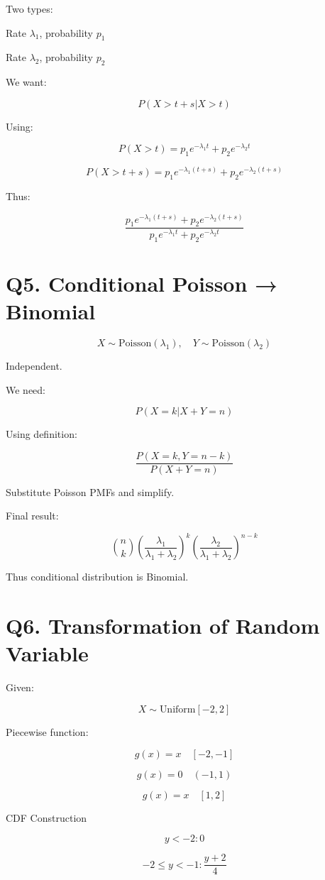 \documentclass[11pt]{article}
\begin{document}
Two types:

Rate $\lambda_1$, probability $p_1$

Rate $\lambda_2$, probability $p_2$

We want:

\[
P(X>t+s|X>t)
\]

Using:

\[
P(X>t)=p_1e^{-\lambda_1 t}+p_2e^{-\lambda_2 t}
\]

\[
P(X>t+s)=p_1e^{-\lambda_1 (t+s)}+p_2e^{-\lambda_2 (t+s)}
\]

Thus:

\[
\frac{p_1e^{-\lambda_1 (t+s)}+p_2e^{-\lambda_2 (t+s)}}{p_1e^{-\lambda_1 t}+p_2e^{-\lambda_2 t}}
\]

\section*{Q5. Conditional Poisson → Binomial}

\[
X \sim \text{Poisson}(\lambda_1), \quad Y \sim \text{Poisson}(\lambda_2)
\]

Independent.

We need:

\[
P(X=k|X+Y=n)
\]

Using definition:

\[
\frac{P(X=k,Y=n-k)}{P(X+Y=n)}
\]

Substitute Poisson PMFs and simplify.

Final result:

\[
\binom{n}{k}\left(\frac{\lambda_1}{\lambda_1+\lambda_2}\right)^k
\left(\frac{\lambda_2}{\lambda_1+\lambda_2}\right)^{n-k}
\]

Thus conditional distribution is Binomial.

\section*{Q6. Transformation of Random Variable}

Given:

\[
X \sim \text{Uniform}[-2,2]
\]

Piecewise function:

\[
g(x)=x \quad [-2,-1]
\]

\[
g(x)=0 \quad (-1,1)
\]

\[
g(x)=x \quad [1,2]
\]

CDF Construction

\[
y<-2: 0
\]

\[
-2\le y<-1: \frac{y+2}{4}
\]
\end{document}
